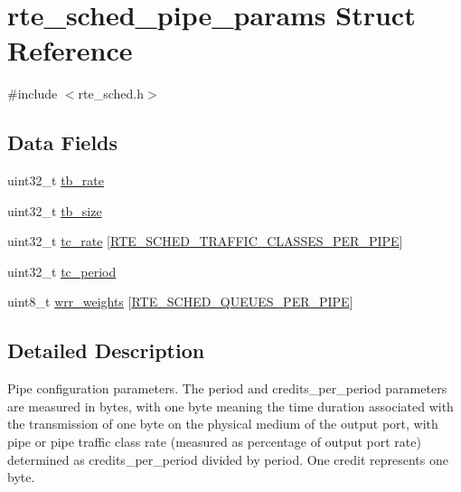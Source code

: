 \hypertarget{structrte__sched__pipe__params}{}\section{rte\+\_\+sched\+\_\+pipe\+\_\+params Struct Reference}
\label{structrte__sched__pipe__params}


{\ttfamily \#include $<$rte\+\_\+sched.\+h$>$}

\subsection*{Data Fields}
\begin{DoxyCompactItemize}
\item 
uint32\+\_\+t \hyperlink{structrte__sched__pipe__params_aa64063ce773f9f838ade073d6165dfe5}{tb\+\_\+rate}
\item 
uint32\+\_\+t \hyperlink{structrte__sched__pipe__params_a195cebdb412ff2ca5b671188f11efec3}{tb\+\_\+size}
\item 
uint32\+\_\+t \hyperlink{structrte__sched__pipe__params_a2cf879b3b3815b594057ba4dfcbb13bb}{tc\+\_\+rate} \mbox{[}\hyperlink{rte__sched_8h_a987eaedb9cd05abdbdb1bf30ed446ac1}{R\+T\+E\+\_\+\+S\+C\+H\+E\+D\+\_\+\+T\+R\+A\+F\+F\+I\+C\+\_\+\+C\+L\+A\+S\+S\+E\+S\+\_\+\+P\+E\+R\+\_\+\+P\+I\+P\+E}\mbox{]}
\item 
uint32\+\_\+t \hyperlink{structrte__sched__pipe__params_a9c10b3eb86bcd8d9db80b934a4340e5d}{tc\+\_\+period}
\item 
uint8\+\_\+t \hyperlink{structrte__sched__pipe__params_a099371854d95799a1e24a258510ad5f5}{wrr\+\_\+weights} \mbox{[}\hyperlink{rte__sched_8h_a21bfcaf525e24b9b562a80a894e33245}{R\+T\+E\+\_\+\+S\+C\+H\+E\+D\+\_\+\+Q\+U\+E\+U\+E\+S\+\_\+\+P\+E\+R\+\_\+\+P\+I\+P\+E}\mbox{]}
\end{DoxyCompactItemize}


\subsection{Detailed Description}
Pipe configuration parameters. The period and credits\+\_\+per\+\_\+period parameters are measured in bytes, with one byte meaning the time duration associated with the transmission of one byte on the physical medium of the output port, with pipe or pipe traffic class rate (measured as percentage of output port rate) determined as credits\+\_\+per\+\_\+period divided by period. One credit represents one byte. 

